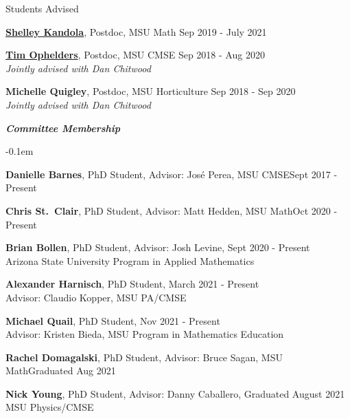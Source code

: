 \documentclass{resume} %
\begin{document}
\begin{rSection}{Students Advised}
\begin{list}{}{\leftmargin=1em}
   \item \textbf{\href{www.shelleykandola.com}{Shelley Kandola}}, Postdoc, MSU Math \hfill Sep 2019 - July 2021

   \item \textbf{\href{https://research.tue.nl/en/persons/tim-ae-ophelders}{Tim Ophelders}}, Postdoc, MSU CMSE \hfill Sep 2018 - Aug 2020\\
   \phantom{XXX} \textit{Jointly advised with Dan Chitwood}
   \item \textbf{Michelle Quigley}, Postdoc, MSU Horticulture \hfill Sep 2018 - Sep 2020\\
   \phantom{XXX} \textit{Jointly advised with Dan Chitwood}
\end{list}

\textbf{\textit{Committee Membership}}
\begin{list}{}{\leftmargin=1em}
   \itemsep -0.1em %


   \item \textbf{Danielle Barnes}, PhD Student, Advisor: Jos\'e Perea, MSU CMSE\hfill Sept 2017 - Present




   \item \textbf{Chris St.~Clair}, PhD Student, Advisor: Matt Hedden, MSU Math\hfill Oct 2020 - Present
    \item \textbf{Brian Bollen}, PhD Student, Advisor: Josh Levine, \hfill Sept 2020 - Present\\
    \phantom{xxx}Arizona State University Program in Applied Mathematics
   \item \textbf{Alexander Harnisch}, PhD Student, \hfill March 2021 - Present\\
   \phantom{xxx}Advisor: Claudio Kopper, MSU PA/CMSE
   \item \textbf{Michael Quail}, PhD Student, \hfill Nov 2021 - Present\\
   \phantom{xxx}Advisor: Kristen Bieda, MSU Program in Mathematics Education

   \item \textbf{Rachel Domagalski}, PhD Student, Advisor: Bruce Sagan, MSU Math\hfill Graduated Aug 2021
   \item \textbf{Nick Young}, PhD Student, Advisor: Danny Caballero, \hfill Graduated August 2021\\
   \phantom{xxx}MSU Physics/CMSE


\end{list}
\end{rSection}
\end{document}
